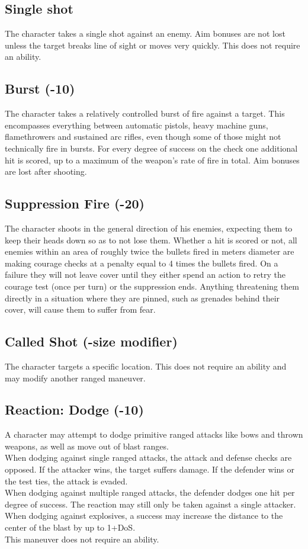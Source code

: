 \subsection*{Single shot}
The character takes a single shot against an enemy. Aim bonuses are not lost unless the target breaks line of sight or moves very quickly. This does not require an ability.
\subsection*{Burst (-10)}
The character takes a relatively controlled burst of fire against a target. This encompasses everything between automatic pistols, heavy machine guns, flamethrowers and sustained arc rifles, even though some of those might not technically fire in bursts. For every degree of success on the check one additional hit is scored, up to a maximum of the weapon’s rate of fire in total. Aim bonuses are lost after shooting.
\subsection*{Suppression Fire (-20)}
The character shoots in the general direction of his enemies, expecting them to keep their heads down so as to not lose them. Whether a hit is scored or not, all enemies within an area of roughly twice the bullets fired in meters diameter are making courage checks at a penalty equal to 4 times the bullets fired. On a failure they will not leave cover until they either spend an action to retry the courage test (once per turn) or the suppression ends. Anything threatening them directly in a situation where they are pinned, such as grenades behind their cover, will cause them to suffer from fear.
\subsection*{Called Shot (-size modifier)}
The character targets a specific location. This does not require an ability and may modify another ranged maneuver.
\subsection*{Reaction: Dodge (-10)}
A character may attempt to dodge primitive ranged attacks like bows and thrown weapons, as well as move out of blast ranges.\\
When dodging against single ranged attacks, the attack and defense checks are opposed. If the attacker wins, the target suffers damage. If the defender wins or the test ties, the attack is evaded.\\
When dodging against multiple ranged attacks, the defender dodges one hit per degree of success. The reaction may still only be taken against a single attacker.\\
When dodging against explosives, a success may increase the distance to the center of the blast by up to 1+DoS.\\
This maneuver does not require an ability.
